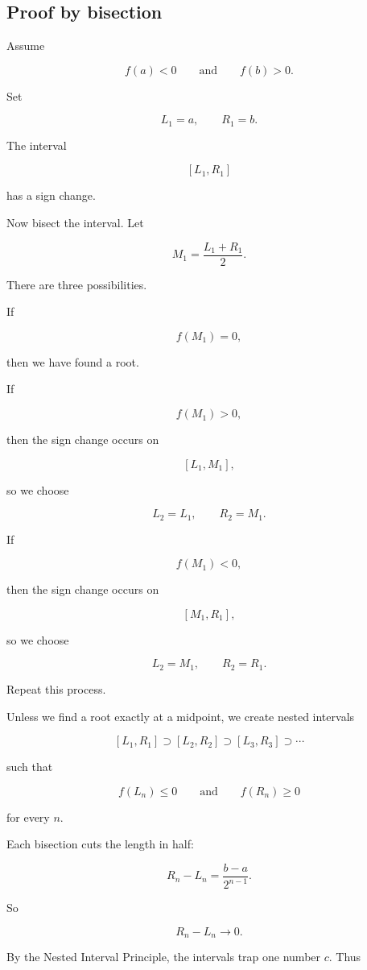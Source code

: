 \subsection{Proof by bisection}
\label{appsubsec:bolzano-proof-bisection}

Assume

\[
f(a)<0
\qquad\text{and}\qquad
f(b)>0.
\]

Set

\[
L_1=a,
\qquad
R_1=b.
\]

The interval

\[
[L_1,R_1]
\]

has a sign change.

Now bisect the interval.  Let

\[
M_1=\frac{L_1+R_1}{2}.
\]

There are three possibilities.

If

\[
f(M_1)=0,
\]

then we have found a root.

If

\[
f(M_1)>0,
\]

then the sign change occurs on

\[
[L_1,M_1],
\]

so we choose

\[
L_2=L_1,
\qquad
R_2=M_1.
\]

If

\[
f(M_1)<0,
\]

then the sign change occurs on

\[
[M_1,R_1],
\]

so we choose

\[
L_2=M_1,
\qquad
R_2=R_1.
\]

Repeat this process.

Unless we find a root exactly at a midpoint, we create nested intervals

\[
[L_1,R_1]\supset [L_2,R_2]\supset [L_3,R_3]\supset\cdots
\]

such that

\[
f(L_n)\le0
\qquad\text{and}\qquad
f(R_n)\ge0
\]

for every \(n\).

Each bisection cuts the length in half:

\[
R_n-L_n=\frac{b-a}{2^{n-1}}.
\]

So

\[
R_n-L_n\to0.
\]

By the Nested Interval Principle, the intervals trap one number \(c\).  Thus

